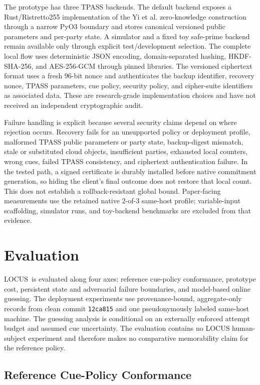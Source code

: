 \documentclass[sigconf,anonymous]{acmart}
\newcommand{\LOCUS}{\textsf{LOCUS}}
\begin{document}
The prototype has three TPASS backends. The default backend exposes a Rust/Ristretto255 implementation of the Yi et al. zero-knowledge construction through a narrow PyO3 boundary and stores canonical versioned public parameters and per-party state. A simulator and a fixed toy safe-prime backend remain available only through explicit test/development selection. The complete local flow uses deterministic JSON encoding, domain-separated hashing, HKDF-SHA-256, and AES-256-GCM through pinned libraries. The versioned ciphertext format uses a fresh 96-bit nonce and authenticates the backup identifier, recovery nonce, TPASS parameters, cue policy, security policy, and cipher-suite identifiers as associated data. These are research-grade implementation choices and have not received an independent cryptographic audit.

Failure handling is explicit because several security claims depend on where rejection occurs. Recovery fails for an unsupported policy or deployment profile, malformed TPASS public parameters or party state, backup-digest mismatch, stale or substituted cloud objects, insufficient parties, exhausted local counters, wrong cues, failed TPASS consistency, and ciphertext authentication failure. In the tested path, a signed certificate is durably installed before native commitment generation, so hiding the client's final outcome does not restore that local count. This does not establish a rollback-resistant global bound. Paper-facing measurements use the retained native 2-of-3 same-host profile; variable-input scaffolding, simulator runs, and toy-backend benchmarks are excluded from that evidence.

\section{Evaluation}
\label{sec:evaluation}

\LOCUS\ is evaluated along four axes: reference cue-policy conformance, prototype cost, persistent state and adversarial failure boundaries, and model-based online guessing. The deployment experiments use provenance-bound, aggregate-only records from clean commit \texttt{12ca815} and one pseudonymously labeled same-host machine. The guessing analysis is conditional on an externally enforced attempt budget and assumed cue uncertainty. The evaluation contains no LOCUS human-subject experiment and therefore makes no comparative memorability claim for the reference policy.

\subsection{Reference Cue-Policy Conformance}
\end{document}
